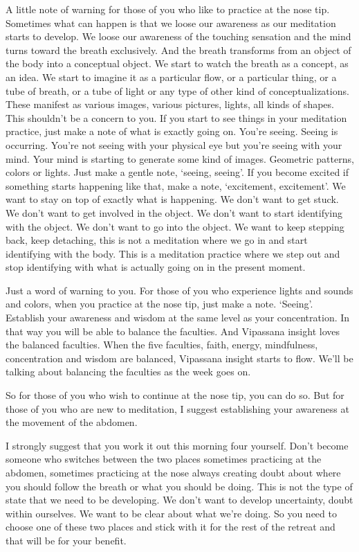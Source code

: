 \documentclass[letterpaper,10pt,english]{sphinxmanual}
\begin{document}
\sphinxAtStartPar
A little note of warning for those of you who like to practice at the nose
tip. Sometimes what can happen is that we loose our awareness as our meditation starts to develop. We loose our awareness of the touching sensation
  and the mind turns toward the breath exclusively. And the breath transforms
from an object of the body into a conceptual object. We start to watch the
breath as a concept, as an idea. We start to imagine it as a particular flow, or
a particular thing, or a tube of breath, or a tube of light or any type of other
kind of conceptualizations. These manifest as various images, various pictures, lights, all kinds of shapes. This shouldn’t be a concern to you. If you
start to see things in your meditation practice, just make a note of what is
exactly going on. You’re seeing. Seeing is occurring. You’re not seeing with
your physical eye but you’re seeing with your mind. Your mind is starting
to generate some kind of images. Geometric patterns, colors or lights. Just
make  a  gentle  note,  ‘seeing,  seeing’.  If  you  become  excited  if  something
starts happening like that, make a note, ‘excitement, excitement’. We want
to stay on top of exactly what is happening. We don’t want to get stuck. We
don’t want to get involved in the object. We don’t want to start identifying
with the object. We don’t want to go into the object. We want to keep stepping back, keep detaching, this is not a meditation where we go in and start
identifying with the body. This is a meditation practice where we step out
and stop identifying with what is actually going on in the present moment.

\sphinxAtStartPar
Just a word of warning to you. For those of you who experience lights
and sounds and colors, when you practice at the nose tip, just make a note.
‘Seeing’.  Establish  your  awareness  and  wisdom  at  the  same  level  as  your
concentration.  In  that  way  you  will  be  able  to  balance  the  faculties. And
Vipassana insight loves the balanced faculties. When the five faculties, faith,
energy,  mindfulness,  concentration  and  wisdom  are  balanced,  Vipassana
insight starts to flow. We’ll be talking about balancing the faculties as the
week goes on.

\sphinxAtStartPar
So for those of you who wish to continue at the nose tip, you can do so.
But for those of you who are new to meditation, I suggest establishing your
awareness at the movement of the abdomen.

\sphinxAtStartPar
I strongly suggest that you work it out this morning four yourself. Don’t
become someone who switches between the two places sometimes practicing at the abdomen, sometimes practicing at the nose always creating doubt
about  where  you  should  follow  the  breath  or  what  you  should  be  doing.
This is not the type of state that we need to be developing. We don’t want to
  develop uncertainty, doubt within ourselves. We want to be clear about what
we’re doing. So you need to choose one of these two places and stick with it
for the rest of the retreat and that will be for your benefit.
\end{document}
